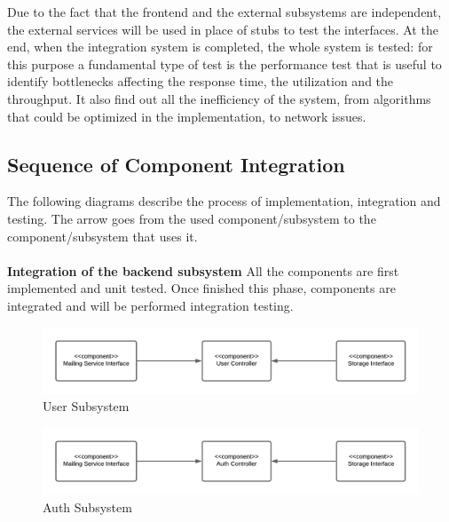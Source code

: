 \documentclass[a4paper, 12pt, oneside, table]{article}
\begin{document}
Due to the fact that the frontend and the external subsystems are independent, the external services will be used in place of stubs to test the interfaces.
At the end, when the integration system is completed, the whole system is
tested: for this purpose a fundamental type of test is the performance test that
is useful to identify bottlenecks affecting the response time, the utilization and
the throughput. It also find out all the inefficiency of the system, from algorithms that could be optimized in the implementation, to network issues.

\subsection{Sequence of Component Integration}
The following diagrams describe the process of implementation, integration and testing. The arrow goes from the used component/subsystem to the component/subsystem that uses it.\\
\\
\textbf{Integration of the backend subsystem}
All the components are first implemented and unit tested. Once finished this phase, components are integrated and will be performed integration testing.

\begin{figure}[h!]
\centering
    \centering
    \includegraphics[height=0.4\textheight, width=0.9\linewidth, keepaspectratio]{img/user_subsystem.png}
    \caption{User Subsystem}
    \label{user_subsys}
\end{figure}

\begin{figure}[h!]
\centering
    \centering
    \includegraphics[height=0.4\textheight, width=0.9\linewidth, keepaspectratio]{img/auth_controller.png}
    \caption{Auth Subsystem}
    \label{auth_subsys}
\end{figure}
\end{document}
